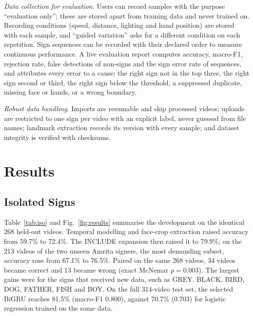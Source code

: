 \documentclass[conference]{IEEEtran}
\begin{document}
\textit{Data collection for evaluation.} Users can record samples with the purpose ``evaluation only''; these are stored apart from training data and never trained on. Recording conditions (speed, distance, lighting and hand position) are stored with each sample, and ``guided variation'' asks for a different condition on each repetition. Sign sequences can be recorded with their declared order to measure continuous performance. A live evaluation report computes accuracy, macro-F1, rejection rate, false detections of non-signs and the sign error rate of sequences, and attributes every error to a cause: the right sign not in the top three, the right sign second or third, the right sign below the threshold, a suppressed duplicate, missing face or hands, or a wrong boundary.

\textit{Robust data handling.} Imports are resumable and skip processed videos; uploads are restricted to one sign per video with an explicit label, never guessed from file names; landmark extraction records its version with every sample; and dataset integrity is verified with checksums.

\section{Results}
\subsection{Isolated Signs}
Table~\ref{tab:iso} and Fig.~\ref{fig:results} summarise the development on the identical 268 held-out videos. Temporal modelling and face-crop extraction raised accuracy from 59.7\% to 72.4\%. The INCLUDE expansion then raised it to 79.9\%; on the 213 videos of the two unseen Amrita signers, the most demanding subset, accuracy rose from 67.1\% to 76.5\%. Paired on the same 268 videos, 34 videos became correct and 13 became wrong (exact McNemar $p=0.003$). The largest gains were for the signs that received new data, such as GREY, BLACK, BIRD, DOG, FATHER, FISH and BOY. On the full 314-video test set, the selected BiGRU reaches 81.5\% (macro-F1 0.800), against 70.7\% (0.703) for logistic regression trained on the same data.
\end{document}
